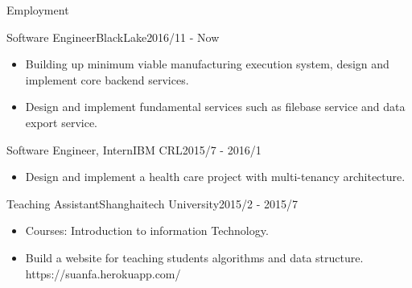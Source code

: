 \documentclass[]{minhuacv}
\begin{document}
	\makeheader
	
	\begin{cvsection}{Employment}
		\begin{cvsubsection}{Software Engineer}{BlackLake}{2016/11 - Now}
			\begin{itemize}
				\item Building up minimum viable manufacturing execution system, design and implement core backend services.
				\item Design and implement fundamental services such as filebase service and data export service.
			\end{itemize}
		\end{cvsubsection}
		
		\begin{cvsubsection}{Software Engineer, Intern}{IBM CRL}{2015/7 - 2016/1}	
			\begin{itemize}
				\item Design and implement a health care project with multi-tenancy architecture.
			\end{itemize}
		\end{cvsubsection}
		
		\begin{cvsubsection}{Teaching Assistant}{Shanghaitech University}{2015/2 - 2015/7}		
			\begin{itemize}
				\item Courses: Introduction to information Technology.
				\item Build a website for teaching students algorithms and data structure. https://suanfa.herokuapp.com/
			\end{itemize}
		\end{cvsubsection}
		
	\end{cvsection}
	
\end{document}
